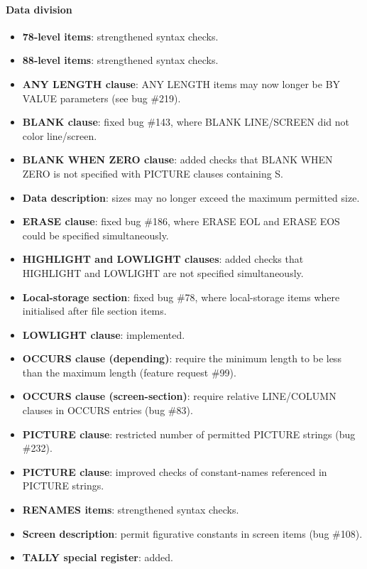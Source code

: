 \paragraph{Data division}
\begin{itemize}
\item \textbf{78-level items}: strengthened syntax checks.
\item \textbf{88-level items}: strengthened syntax checks.
\item \textbf{ANY LENGTH clause}: ANY LENGTH items may now longer be BY VALUE parameters (see bug \#219).
\item \textbf{BLANK clause}: fixed bug \#143, where BLANK LINE\slash{}SCREEN did not color line\slash{}screen.
\item \textbf{BLANK WHEN ZERO clause}: added checks that BLANK WHEN ZERO is not specified with PICTURE clauses containing S.
\item \textbf{Data description}: sizes may no longer exceed the maximum permitted size.
\item \textbf{ERASE clause}: fixed bug \#186, where ERASE EOL and ERASE EOS could be specified simultaneously.
\item \textbf{HIGHLIGHT and LOWLIGHT clauses}: added checks that HIGHLIGHT and LOWLIGHT are not specified simultaneously.
\item \textbf{Local-storage section}: fixed bug \#78, where local-storage items where initialised after file section items.
\item \textbf{LOWLIGHT clause}: implemented.
\item \textbf{OCCURS clause (depending)}: require the minimum length to be less than the maximum length (feature request \#99).
\item \textbf{OCCURS clause (screen-section)}: require relative LINE\slash{}COLUMN clauses in OCCURS entries (bug \#83).
\item \textbf{PICTURE clause}: restricted number of permitted PICTURE strings (bug \#232).
\item \textbf{PICTURE clause}: improved checks of constant-names referenced in PICTURE strings.
\item \textbf{RENAMES items}: strengthened syntax checks.
\item \textbf{Screen description}: permit figurative constants in screen items (bug \#108).
\item \textbf{TALLY special register}: added.
\end{itemize}

